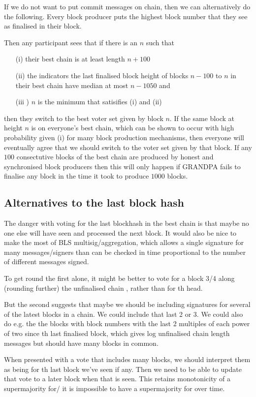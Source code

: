 \documentclass{article}
\begin{document}
If we do not want to put commit messages on chain, then we can alternatively do the following. Every block producer puts the highest block number that they see as finalised in their block.

Then any participant sees that if there is an $n$ such that
\begin{itemize}
\item[(i)] their best chain is at least length $n+100$
\item[(ii)] the indicators the last finalised block height of blocks $n-100$ to $n$ in their best chain have median at most $n-1050$ and
\item[(iii]) $n$ is the minimum that satisifies (i) and (ii)
\end{itemize}
then they switch to the best voter set given by block $n$. If the same block at height $n$ is on everyone's best chain, which can be shown to occur with high probability given (i) for many block production mechanisms, then everyone will eventually agree that we should switch to the voter set given by that block. If any $100$ consectutive blocks of the best chain are produced by honest and synchronised block producers then this will only happen if GRANDPA fails to finalise any block in the time it took to produce $1000$ blocks.

\subsection{Alternatives to the last block hash}

The danger with voting for the last blockhash in the best chain is that maybe no one else will have seen and processed the next block. It would also be nice to make the most of BLS multisig/aggregation, which allows a single signature for many messages/signers than can be checked in time proportional to the number of different messages signed. 

To get round the first alone, it might be better to vote for a block 3/4 along (rounding further) the unfinalised chain , rather than for th head.

But the second suggests that maybe we should be including signatures for several of the latest blocks in a chain. We could include that last 2 or 3. We could also do e.g. the the blocks with block numbers with the last 2 multiples of each power of two since th last finalised block, which gives log unfinalised chain length messages but should have many blocks in common.

When presented with a vote that includes many blocks, we should interpret them as being for th last block we've seen if any. Then we need to be able to update that vote to a later block when that is seen. This retains monotonicity of a supermajority for/ it is impossible to have a supermajority for over time.
\end{document}
